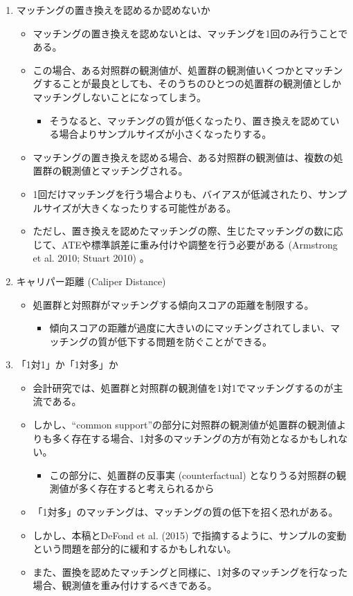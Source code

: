 \begin{enumerate}
 \item マッチングの置き換えを認めるか認めないか
   \begin{itemize}
    \item マッチングの置き換えを認めないとは、マッチングを1回のみ行うことである。
    \item この場合、ある対照群の観測値が、処置群の観測値いくつかとマッチングすることが最良としても、そのうちのひとつの処置群の観測値としかマッチングしないことになってしまう。
    \begin{itemize}
     \item そうなると、マッチングの質が低くなったり、置き換えを認めている場合よりサンプルサイズが小さくなったりする。
    \end{itemize}
    \item マッチングの置き換えを認める場合、ある対照群の観測値は、複数の処置群の観測値とマッチングされる。
    \item 1回だけマッチングを行う場合よりも、バイアスが低減されたり、サンプルサイズが大きくなったりする可能性がある。
    \item ただし、置き換えを認めたマッチングの際、生じたマッチングの数に応じて、ATEや標準誤差に重み付けや調整を行う必要がある (Armstrong et al. 2010; Stuart 2010) 。
   \end{itemize}
 \item キャリパー距離 (Caliper Distance) 
   \begin{itemize}
    \item 処置群と対照群がマッチングする傾向スコアの距離を制限する。
     \begin{itemize}
      \item 傾向スコアの距離が過度に大きいのにマッチングされてしまい、マッチングの質が低下する問題を防ぐことができる。
    \end{itemize}
   \end{itemize}
 \item 「1対1」か「1対多」か
   \begin{itemize}
    \item 会計研究では、処置群と対照群の観測値を1対1でマッチングするのが主流である。
    \item しかし、“common support”の部分に対照群の観測値が処置群の観測値よりも多く存在する場合、1対多のマッチングの方が有効となるかもしれない。
     \begin{itemize}    
      \item この部分に、処置群の反事実 (counterfactual) となりうる対照群の観測値が多く存在すると考えられるから
     \end{itemize}
    \item 「1対多」のマッチングは、マッチングの質の低下を招く恐れがある。
    \item しかし、本稿とDeFond et al. (2015) で指摘するように、サンプルの変動という問題を部分的に緩和するかもしれない。
    \item また、置換を認めたマッチングと同様に、1対多のマッチングを行なった場合、観測値を重み付けするべきである。
   \end{itemize}
\end{enumerate}

